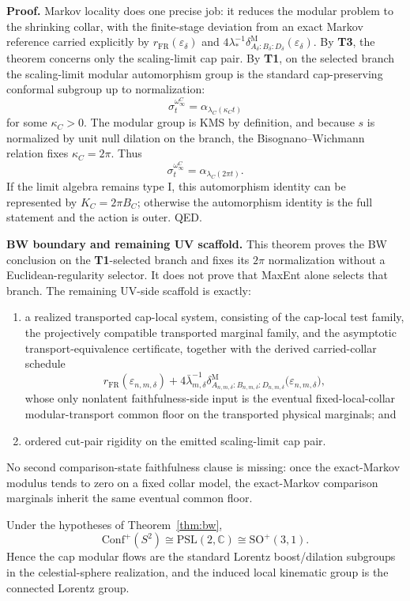 \textbf{Proof.} Markov locality does one precise job: it reduces the modular problem to the shrinking collar, with the finite-stage deviation from an exact Markov reference carried explicitly by \(r_{\mathrm{FR}}(\varepsilon_\delta)\) and \(4\lambda_\ast^{-1}\delta^{\mathrm M}_{A_\delta:B_\delta:D_\delta}(\varepsilon_\delta)\). By \textbf{T3}, the theorem concerns only the scaling-limit cap pair. By \textbf{T1}, on the selected branch the scaling-limit modular automorphism group is the standard cap-preserving conformal subgroup up to normalization:
\[
\sigma_t^{\omega_\infty^C}
=
\alpha_{\lambda_C(\kappa_C t)}
\]
for some \(\kappa_C>0\). The modular group is KMS by definition, and because \(s\) is normalized by unit null dilation on the branch, the Bisognano--Wichmann relation fixes \(\kappa_C=2\pi\). Thus
\[
\sigma_t^{\omega_\infty^C}
=
\alpha_{\lambda_C(2\pi t)}.
\]
If the limit algebra remains type I, this automorphism identity can be represented by \(K_C=2\pi B_C\); otherwise the automorphism identity is the full statement and the action is outer. QED.

\textbf{BW boundary and remaining UV scaffold.} This theorem proves the BW conclusion on the \textbf{T1}-selected branch and fixes its \(2\pi\) normalization without a Euclidean-regularity selector. It does not prove that MaxEnt alone selects that branch. The remaining UV-side scaffold is exactly:
\begin{enumerate}[leftmargin=2em]
\item a realized transported cap-local system, consisting of the cap-local test family, the projectively compatible transported marginal family, and the asymptotic transport-equivalence certificate, together with the derived carried-collar schedule
\[
r_{\mathrm{FR}}(\varepsilon_{n,m,\delta})
+
4\bar\lambda_{m,\delta}^{-1}
\delta^{\mathrm M}_{A_{n,m,\delta}:B_{n,m,\delta}:D_{n,m,\delta}}
\bigl(\varepsilon_{n,m,\delta}\bigr),
\]
whose only nonlatent faithfulness-side input is the eventual fixed-local-collar modular-transport common floor on the transported physical marginals; and
\item ordered cut-pair rigidity on the emitted scaling-limit cap pair.
\end{enumerate}
No second comparison-state faithfulness clause is missing: once the exact-Markov modulus tends to zero on a fixed collar model, the exact-Markov comparison marginals inherit the same eventual common floor.

\begin{corollary}\label{cor:lorentz}
Under the hypotheses of Theorem~\ref{thm:bw},
\[
\mathrm{Conf}^+(S^2)\cong \mathrm{PSL}(2,\mathbb C)\cong \mathrm{SO}^+(3,1).
\]
Hence the cap modular flows are the standard Lorentz boost/dilation subgroups in the celestial-sphere realization, and the induced local kinematic group is the connected Lorentz group.
\end{corollary}

